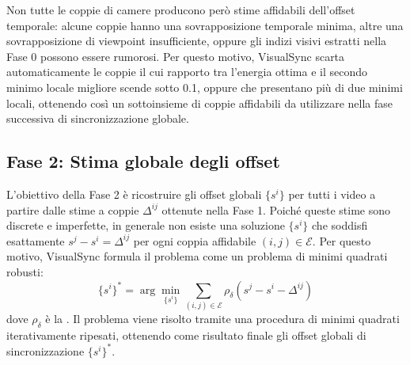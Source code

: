 Non tutte le coppie di camere producono però stime affidabili dell'offset temporale: alcune coppie hanno una sovrapposizione temporale minima, altre una sovrapposizione di viewpoint insufficiente, oppure gli indizi visivi estratti nella Fase 0 possono essere rumorosi. Per questo motivo, VisualSync scarta automaticamente le coppie il cui rapporto tra l'energia ottima e il secondo minimo locale migliore scende sotto 0.1, oppure che presentano più di due minimi locali, ottenendo così un sottoinsieme di coppie affidabili da utilizzare nella fase successiva di sincronizzazione globale.


\subsection{Fase 2: Stima globale degli offset}
L'obiettivo della Fase 2 è ricostruire gli offset globali $\{s^i\}$ per tutti i video a partire dalle stime a coppie $\Delta^{ij}$ ottenute nella Fase 1. Poiché queste stime sono discrete e imperfette, in generale non esiste una soluzione $\{s^i\}$ che soddisfi esattamente $s^j - s^i = \Delta^{ij}$ per ogni coppia affidabile $(i,j) \in \mathcal{E}$. Per questo motivo, VisualSync formula il problema come un problema di minimi quadrati robusti:
\begin{equation}
\{s^i\}^* = \arg\min_{\{s^i\}} \sum_{(i,j) \in \mathcal{E}} \rho_\delta\left(s^j - s^i - \Delta^{ij}\right)
\end{equation}
dove $\rho_\delta$ è la . Il problema viene risolto tramite una procedura di minimi quadrati iterativamente ripesati, ottenendo come risultato finale gli offset globali di sincronizzazione $\{s^i\}^*$. \cite{visualsync}